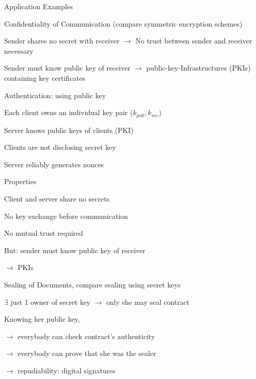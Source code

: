 \documentclass[a4paper]{article}
\begin{document}
\begin{multicols}{3}
    Application Examples
    \begin{enumerate*}
        \item Confidentiality of Communication (compare symmetric encryption schemes)
        \begin{itemize*}
            \item Sender shares no secret with receiver $\rightarrow$ No trust between sender and receiver necessary
            \item Sender must know public key of receiver $\rightarrow$ public-key-Infrastructures (PKIs) containing key certificates
        \end{itemize*}
        \item Authentication: using public key
        \begin{itemize*}
            \item Each client owns an individual key pair ($k_{pub}, k_{sec}$)
            \item Server knows public keys of clients (PKI)
            \item Clients are not disclosing secret key
            \item Server reliably generates nonces
            \item Properties
            \begin{itemize*}
                \item Client and server share no secrets
                \item No key exchange before communication
                \item No mutual trust required
                \item But: sender must know public key of receiver
                \item[$\rightarrow$] PKIs
            \end{itemize*}
        \end{itemize*}
        \item Sealing of Documents, compare sealing using secret keys
        \begin{itemize*}
            \item $\exists$ just 1 owner of secret key $\rightarrow$ only she may seal contract
            \item Knowing her public key,
            \begin{itemize*}
                \item[$\rightarrow$] everybody can check contract’s authenticity
                \item[$\rightarrow$] everybody can prove that she was the sealer
                \item[$\rightarrow$] repudiability: digital signatures
            \end{itemize*}
        \end{itemize*}
    \end{enumerate*}


\end{multicols}
\end{document}

